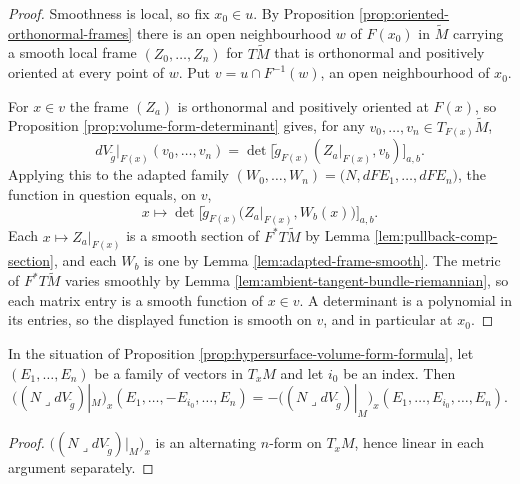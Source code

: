 \begin{proof}
\leanok
{}
Smoothness is local, so fix $x_0 \in u$. By Proposition \ref{prop:oriented-orthonormal-frames}
there is an open neighbourhood $w$ of $F(x_0)$ in $\tilde M$ carrying a smooth local frame
$(Z_0, \ldots, Z_n)$ for $T\tilde M$ that is orthonormal and positively oriented at every point
of $w$. Put $v = u \cap F^{-1}(w)$, an open neighbourhood of $x_0$.

For $x \in v$ the frame $(Z_a)$ is orthonormal and positively oriented at $F(x)$, so Proposition
\ref{prop:volume-form-determinant} gives, for any $v_0, \ldots, v_n \in T_{F(x)}\tilde M$,
\[
  dV_{\tilde g}|_{F(x)}(v_0, \ldots, v_n)
    = \det\bigl[\tilde g_{F(x)}(Z_a|_{F(x)}, v_b)\bigr]_{a,b}.
\]
Applying this to the adapted family $(W_0, \ldots, W_n) = \bigl(N, dF E_1, \ldots, dF E_n\bigr)$,
the function in question equals, on $v$,
\[
  x \longmapsto \det\bigl[\tilde g_{F(x)}\bigl(Z_a|_{F(x)}, W_b(x)\bigr)\bigr]_{a,b}.
\]
Each $x \mapsto Z_a|_{F(x)}$ is a smooth section of $F^* T\tilde M$ by Lemma
\ref{lem:pullback-comp-section}, and each $W_b$ is one by Lemma \ref{lem:adapted-frame-smooth}.
The metric of $F^* T\tilde M$ varies smoothly by Lemma
\ref{lem:ambient-tangent-bundle-riemannian}, so each matrix entry is a smooth function of
$x \in v$. A determinant is a polynomial in its entries, so the displayed function is smooth on
$v$, and in particular at $x_0$.
\end{proof}

\begin{lemma}
\label{lem:normal-restrict-neg-member}
\leanok
{}
In the situation of Proposition \ref{prop:hypersurface-volume-form-formula}, let
$(E_1, \ldots, E_n)$ be a family of vectors in $T_x M$ and let $i_0$ be an index. Then
\[
  \bigl((N \lrcorner dV_{\tilde g})|_M\bigr)_x(E_1, \ldots, -E_{i_0}, \ldots, E_n)
    = - \bigl((N \lrcorner dV_{\tilde g})|_M\bigr)_x(E_1, \ldots, E_{i_0}, \ldots, E_n).
\]
\end{lemma}

\begin{proof}
\leanok
$\bigl((N \lrcorner dV_{\tilde g})|_M\bigr)_x$ is an alternating $n$-form on $T_x M$, hence
linear in each argument separately.
\end{proof}

